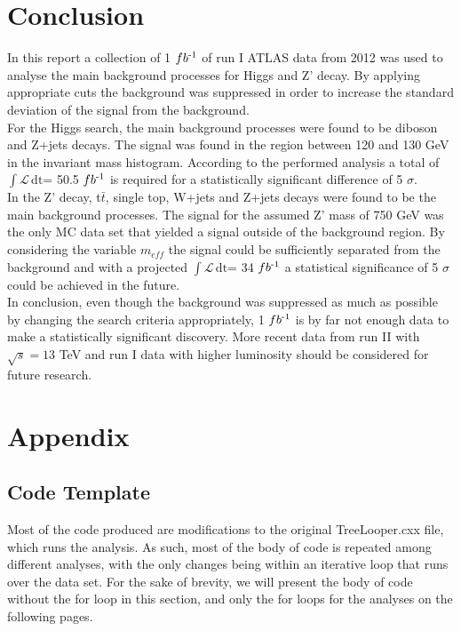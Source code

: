 \documentclass[runningheads,a4paper]{llncs}
\newcommand{\invfb}{fb\textsuperscript{-1}}
\newcommand{\lumi}{$\int \mathcal{L} \, \mathrm{dt}$}
\begin{document}

\section{Conclusion}

In this report a collection of 1 $\invfb$ of run I ATLAS data from 2012 was used to analyse the main background processes for Higgs and Z' decay. By applying appropriate cuts the background was suppressed in order to increase the standard deviation of the signal from the background. \\

For the Higgs search, the main background processes were found to be diboson and Z+jets decays. The signal was found in the region between 120 and 130 GeV in the invariant mass histogram. According to the performed analysis a total of \lumi = 50.5 $\invfb$ is required for a statistically significant difference of 5 $\sigma$.\\

In the Z' decay, t$\bar{t}$, single top, W+jets and Z+jets decays were found to be the main background processes. The signal for the assumed Z' mass of 750 GeV was the only MC data set that yielded a signal outside of the background region. By considering the variable ${m}_{eff}$ the signal could be sufficiently separated from the background and with a projected \lumi = 34 $\invfb$ a statistical significance of 5 $\sigma$ could be achieved in the future.\\

In conclusion, even though the background was suppressed as much as possible by changing the search criteria appropriately, 1 $\invfb$ is by far not enough data to make a statistically significant discovery. More recent data from run II with $\sqrt {s} = 13$ TeV and run I data with higher luminosity should be considered for future research.\\




\pagebreak
\section{Appendix}

\subsection{Code Template}
Most of the code produced are modifications to the original {\selectfont TreeLooper.cxx} file, which runs the analysis. As such, most of the body of code is repeated among different analyses, with the only changes being within an iterative loop that runs over the data set. For the sake of brevity, we will present the body of code without the for loop in this section, and only the for loops for the analyses on the following pages.\\
\end{document}

